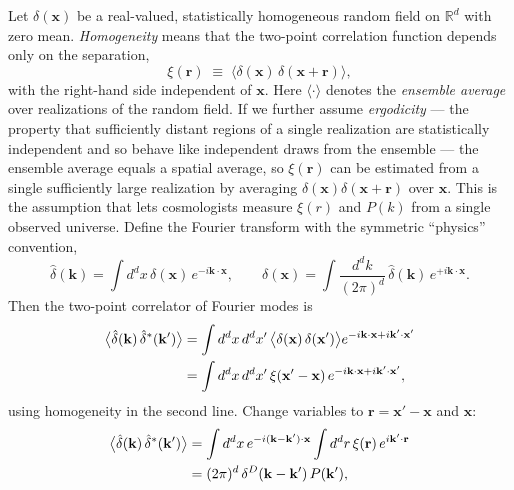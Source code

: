 \documentclass[12pt]{article}
\begin{document}
Let $\delta(\mathbf x)$ be a real-valued, statistically homogeneous
random field on $\mathbb R^d$ with zero mean. \emph{Homogeneity} means
that the two-point correlation function depends only on the
separation,
\begin{equation}\label{eq:xi-def}
  \xi(\mathbf r) \;\equiv\;
  \bigl\langle\delta(\mathbf x)\,\delta(\mathbf x+\mathbf r)\bigr\rangle,
\end{equation}
with the right-hand side independent of $\mathbf x$. Here $\langle
\cdot\rangle$ denotes the \emph{ensemble average} over realizations
of the random field. If we further assume \emph{ergodicity} --- the property that
sufficiently distant regions of a single realization are
statistically independent and so behave like independent draws from
the ensemble --- the ensemble average equals a spatial average, so $\xi(\mathbf r)$ can be
estimated from a single sufficiently large realization by averaging
$\delta(\mathbf x)\delta(\mathbf x+\mathbf r)$ over $\mathbf x$.
This is the assumption that lets cosmologists measure $\xi(r)$ and
$P(k)$ from a single observed universe.
Define the Fourier transform with the symmetric ``physics''
convention,
\begin{equation}\label{eq:ft-def}
  \hat\delta(\mathbf k) = \int d^dx\,\delta(\mathbf x)\,e^{-i\mathbf k\cdot\mathbf x},
  \qquad
  \delta(\mathbf x) = \int\frac{d^dk}{(2\pi)^d}\,\hat\delta(\mathbf k)\,e^{+i\mathbf k\cdot\mathbf x}.
\end{equation}
Then the two-point correlator of Fourier modes is
\begin{align}
  \bigl\langle\hat\delta(\mathbf k)\,\hat\delta^*(\mathbf k')\bigr\rangle
  &= \int d^dx\,d^dx'\,
     \bigl\langle\delta(\mathbf x)\,\delta(\mathbf x')\bigr\rangle
     e^{-i\mathbf k\cdot\mathbf x+i\mathbf k'\cdot\mathbf x'} \notag\\
  &= \int d^dx\,d^dx'\,\xi(\mathbf x'-\mathbf x)\,
     e^{-i\mathbf k\cdot\mathbf x+i\mathbf k'\cdot\mathbf x'},
\end{align}
using homogeneity in the second line. Change variables to $\mathbf
r=\mathbf x'-\mathbf x$ and $\mathbf x$:
\begin{align}
  \bigl\langle\hat\delta(\mathbf k)\,\hat\delta^*(\mathbf k')\bigr\rangle
  &= \int d^dx\,e^{-i(\mathbf k-\mathbf k')\cdot\mathbf x}
     \int d^dr\,\xi(\mathbf r)\,e^{i\mathbf k'\cdot\mathbf r} \notag\\
  &= (2\pi)^d\,\delta^D(\mathbf k-\mathbf k')\,P(\mathbf k'),
  \label{eq:Pk-derived}
\end{align}
\end{document}
